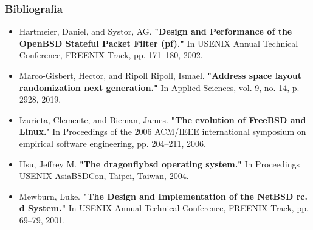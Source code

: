 \documentclass[9pt,xcolor=table]{beamer}
\begin{document}
\begin{frame}
  \frametitle{Bibliografia}
  \begin{itemize}
    \item Hartmeier, Daniel, and Systor, AG. \textbf{"Design and Performance of the OpenBSD Stateful Packet Filter (pf)."} In USENIX Annual Technical Conference, FREENIX Track, pp. 171--180, 2002.
    \item Marco-Gisbert, Hector, and Ripoll Ripoll, Ismael. \textbf{"Address space layout randomization next generation."} In Applied Sciences, vol. 9, no. 14, p. 2928, 2019.
    \item Izurieta, Clemente, and Bieman, James. \textbf{"The evolution of FreeBSD and Linux.}" In Proceedings of the 2006 ACM/IEEE international symposium on empirical software engineering, pp. 204--211, 2006.
    \item Hsu, Jeffrey M. \textbf{"The dragonflybsd operating system."} In Proceedings USENIX AsiaBSDCon, Taipei, Taiwan, 2004.
    \item Mewburn, Luke. \textbf{"The Design and Implementation of the NetBSD rc. d System."} In USENIX Annual Technical Conference, FREENIX Track, pp. 69--79, 2001.
  \end{itemize}
\end{frame}
\end{document}
